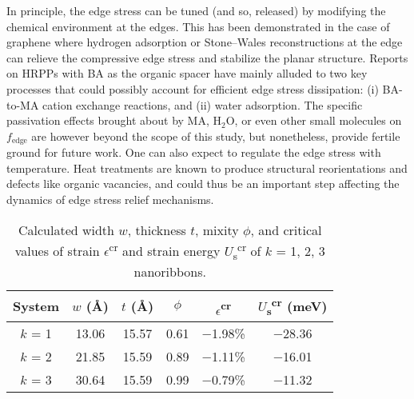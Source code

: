 \documentclass[aps,prl,preprint,11pt,superscriptaddress,bibnotes,amsmath,amssymb,amsfonts,showkeys]{revtex4-2}
\begin{document}
In principle, the edge stress can be tuned (and so, released) by modifying the chemical environment at the edges. This has been demonstrated in the case of graphene where hydrogen adsorption or Stone--Wales reconstructions at the edge can relieve the compressive edge stress and stabilize the planar structure.\cite{HLedgegr09} Reports on HRPPs with BA as the organic spacer have mainly alluded to two key processes that could possibly account for efficient edge stress dissipation: (i) BA-to-MA cation exchange reactions,\cite{QDhetedge20,ZTrevcon19} and (ii) water adsorption.\cite{SDhumid19} The specific passivation effects brought about by MA, H$_2$O, or even other small molecules on $f_{\text{edge}}$ are however beyond the scope of this study, but nonetheless, provide fertile ground for future work. One can also expect to regulate the edge stress with temperature. Heat treatments are known to produce structural reorientations and defects like organic vacancies, and could thus be an important step affecting the dynamics of edge stress relief mechanisms.\cite{LAplanar18}

\begin{table*}
\caption{Calculated width $w$, thickness $t$, mixity $\phi$, and critical values of strain $\epsilon$\textsuperscript{cr} and strain energy $U$\textsubscript{s}\textsuperscript{cr} of $k$ = 1, 2, 3 nanoribbons. \label{relaxed_params}}
\begin{ruledtabular}
{\renewcommand{\arraystretch}{1.5}
\begin{tabular}{cccccc}
System & $w$ (\AA) & $t$ (\AA) & $\phi$ & $\epsilon$\textsuperscript{cr} & $U$\textsubscript{s}\textsuperscript{cr} (meV) \\ \hline
$k$ = 1 & 13.06 & 15.57 & 0.61 & $-$1.98\% & $-$28.36 \\
$k$ = 2 & 21.85 & 15.59 & 0.89 & $-$1.11\% & $-$16.01 \\
$k$ = 3 & 30.64 & 15.59 & 0.99 & $-$0.79\% & $-$11.32
\end{tabular}}
\end{ruledtabular}
\end{table*}
\end{document}

